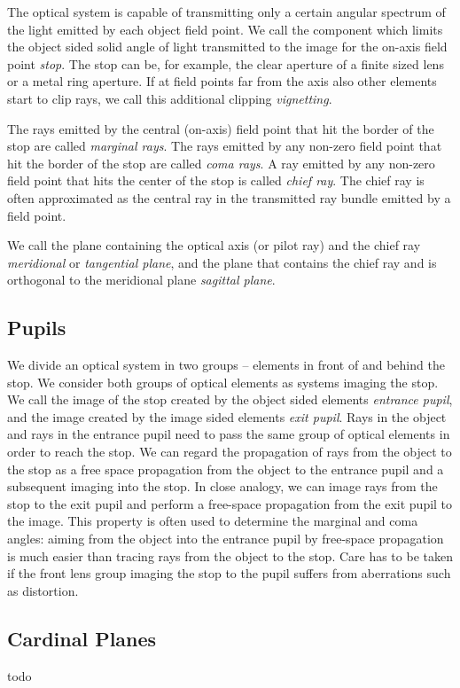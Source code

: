 \documentclass[12pt,a4paper,twoside,openright,BCOR10mm,headsepline,titlepage,abstracton,chapterprefix,final]{scrreprt}
\begin{document}
The optical system is capable of transmitting only a certain angular spectrum of the light emitted by each object field point.
We call the component which limits the object sided solid angle of light transmitted to the image for the on-axis field point \emph{stop}.
The stop can be, for example, the clear aperture of a finite sized lens or a metal ring aperture.
If at field points far from the axis also other elements start to clip rays, we call this additional clipping \emph{vignetting}.

The rays emitted by the central (on-axis) field point that hit the border of the stop are called \emph{marginal rays}.
The rays emitted by any non-zero field point that hit the border of the stop are called \emph{coma rays}.
A ray emitted by any non-zero field point that hits the center of the stop is called \emph{chief ray}.
The chief ray is often approximated as the central ray in the transmitted ray bundle emitted by a field point.

We call the plane containing the optical axis (or pilot ray) and the chief ray \emph{meridional} or \emph{tangential plane}, 
and the plane that contains the chief ray and is orthogonal to the meridional plane \emph{sagittal plane}.

\subsection{Pupils}
We divide an optical system in two groups -- elements in front of and behind the stop. 
We consider both groups of optical elements as systems imaging the stop.
We call the image of the stop created by the object sided elements \emph{entrance pupil}, and the image created by the image sided elements \emph{exit pupil}.
Rays in the object and rays in the entrance pupil need to pass the same group of optical elements in order to reach the stop. 
We can regard the propagation of rays from the object to the stop as a free space propagation from the object to the entrance pupil and a subsequent imaging into the stop.
In close analogy, we can image rays from the stop to the exit pupil and perform a free-space propagation from the exit pupil to the image.
This property is often used to determine the marginal and coma angles: 
aiming from the object into the entrance pupil by free-space propagation is much easier than tracing rays from the object to the stop.
Care has to be taken if the front lens group imaging the stop to the pupil suffers from aberrations such as distortion.

\subsection{Cardinal Planes}
todo
\end{document}
